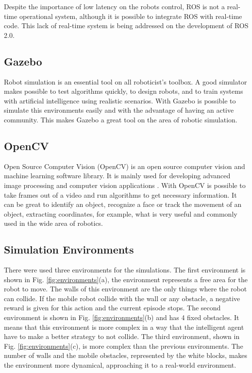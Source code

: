 Despite the importance of low latency on the robots control, ROS is not a real-time operational system, although it is possible to integrate ROS with real-time code. This lack of real-time system is being addressed on the development of ROS 2.0.

\subsection*{Gazebo}

Robot simulation is an essential tool on all roboticist's toolbox.
A good simulator makes possible to test algorithms quickly, to design robots, and to train systems with artificial intelligence using realistic scenarios.
With Gazebo \cite{fairchild2016ros} is possible to simulate this environments easily and with the advantage of having an active community.
This makes Gazebo a great tool on the area of robotic simulation.

\subsection*{OpenCV}

Open Source Computer Vision (OpenCV) is an open source computer vision and machine learning software library.
It is mainly used for developing advanced image processing and computer vision applications \cite{bradski2008learning}.
With OpenCV is possible to take frames out of a video and run algorithms to get necessary information.
It can be great to identify an object, recognize a face or track the movement of an object, extracting coordinates, for example, what is very useful and commonly used in the wide area of robotics.

\subsection*{Simulation Environments}

There were used three environments for the simulations. The first environment is  shown in Fig. \ref{fig:environments}(a), the environment represents a free area for the robot to move.
The walls of this environment are the only things where the robot can collide.
If the mobile robot collide with the wall or any obstacle, a negative reward is given for this action and the current episode stops.
The second environment is shown in Fig. \ref{fig:environments}(b) and has 4 fixed obstacles.
It means that this environment is more complex in a way that the intelligent agent have to make a better strategy to not collide.
The third environment, shown in Fig. \ref{fig:environments}(c), is more complex than the previous environments.  
The number of walls and the mobile obstacles, represented by the white blocks, makes the environment more dynamical, approaching it to a real-world environment.

